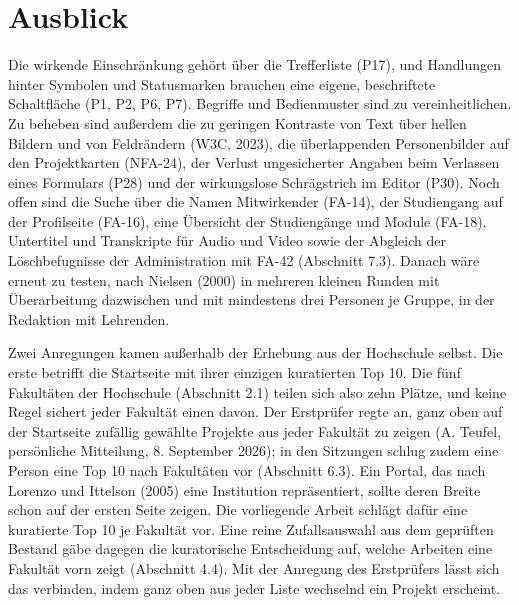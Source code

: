 \section{Ausblick}
\label{sec:ausblick}

Die wirkende Einschränkung gehört über die Trefferliste (P17), und Handlungen hinter Symbolen und Statusmarken brauchen eine eigene, beschriftete Schaltfläche (P1, P2, P6, P7). Begriffe und Bedienmuster sind zu vereinheitlichen. Zu beheben sind außerdem die zu geringen Kontraste von Text über hellen Bildern und von Feldrändern (W3C, 2023), die überlappenden Personenbilder auf den Projektkarten (NFA-24), der Verlust ungesicherter Angaben beim Verlassen eines Formulars (P28) und der wirkungslose Schrägstrich im Editor (P30). Noch offen sind die Suche über die Namen Mitwirkender (FA-14), der Studiengang auf der Profilseite (FA-16), eine Übersicht der Studiengänge und Module (FA-18), Untertitel und Transkripte für Audio und Video sowie der Abgleich der Löschbefugnisse der Administration mit FA-42 (Abschnitt 7.3). Danach wäre erneut zu testen, nach Nielsen (2000) in mehreren kleinen Runden mit Überarbeitung dazwischen und mit mindestens drei Personen je Gruppe, in der Redaktion mit Lehrenden.

Zwei Anregungen kamen außerhalb der Erhebung aus der Hochschule selbst. Die erste betrifft die Startseite mit ihrer einzigen kuratierten Top 10. Die fünf Fakultäten der Hochschule (Abschnitt 2.1) teilen sich also zehn Plätze, und keine Regel sichert jeder Fakultät einen davon. Der Erstprüfer regte an, ganz oben auf der Startseite zufällig gewählte Projekte aus jeder Fakultät zu zeigen (A. Teufel, persönliche Mitteilung, 8. September 2026); in den Sitzungen schlug zudem eine Person eine Top 10 nach Fakultäten vor (Abschnitt 6.3). Ein Portal, das nach Lorenzo und Ittelson (2005) eine Institution repräsentiert, sollte deren Breite schon auf der ersten Seite zeigen. Die vorliegende Arbeit schlägt dafür eine kuratierte Top 10 je Fakultät vor. Eine reine Zufallsauswahl aus dem geprüften Bestand gäbe dagegen die kuratorische Entscheidung auf, welche Arbeiten eine Fakultät vorn zeigt (Abschnitt 4.4). Mit der Anregung des Erstprüfers lässt sich das verbinden, indem ganz oben aus jeder Liste wechselnd ein Projekt erscheint.

